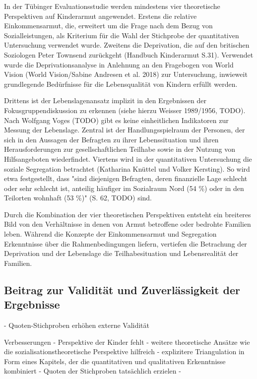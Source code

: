 In der Tübinger Evaluationsstudie werden mindestens vier theoretische Perspektiven auf Kinderarmut angewendet. Erstens die relative Einkommensarmut, die, erweitert um die Frage nach dem Bezug von Sozialleistungen, als Kriterium für die Wahl der Stichprobe der quantitativen Untersuchung verwendet wurde. Zweitens die Deprivation, die auf den britischen Soziologen Peter Townsend zurückgeht (Handbuch Kinderarmut S.31). Verwendet wurde die Deprivationsanalyse in Anlehnung an den Fragebogen von World Vision (World Vision/Sabine Andresen et al. 2018) zur Untersuchung, inwieweit grundlegende Bedürfnisse für die Lebensqualität von Kindern erfüllt werden.

Drittens ist der Lebenslagenansatz implizit in den Ergebnissen der Fokusgruppendiskussion zu erkennen (siehe hierzu Weisser 1989/1956, TODO). Nach Wolfgang Voges (TODO) gibt es keine einheitlichen Indikatoren zur Messung der Lebenslage. Zentral ist der Handlungsspielraum der Personen, der sich in den Aussagen der Befragten zu ihrer Lebenssituation und ihren Herausforderungen zur gesellschaftlichen Teilhabe sowie in der Nutzung von Hilfsangeboten wiederfindet. Viertens wird in der quantitativen Untersuchung die soziale Segregation betrachtet (Katharina Knüttel und Volker Kersting). So wird etwa festgestellt, dass "sind diejenigen Befragten, deren finanzielle Lage schlecht oder sehr schlecht ist, anteilig häufiger im Sozialraum Nord (54 \%) oder in den Teilorten wohnhaft (53 \%)" (S. 62, TODO) sind.

Durch die Kombination der vier theoretischen Perspektiven entsteht ein breiteres Bild von den Verhältnisse in denen von Armut betroffene oder bedrohte Familien leben. Während die Konzepte der Einkommensarmut und Segregation Erkenntnisse über die Rahmenbedingungen liefern, vertiefen die Betrachung der Deprivation und der Lebenslage die Teilhabesituation und Lebensrealität der Familien.

\subsection{Beitrag zur Validität und Zuverlässigkeit der Ergebnisse}



- Quoten-Stichproben erhöhen externe Validität

Verbesserungen
- Perspektive der Kinder fehlt
- weitere theoretische Ansätze wie die sozialisationstheoretische Perspektive hilfreich
- explizitere Triangulation in Form eines Kapitels, der die quantitativen und qualitativen Erkenntnisse kombiniert
- Quoten der Stichproben tatsächlich erzielen
- 